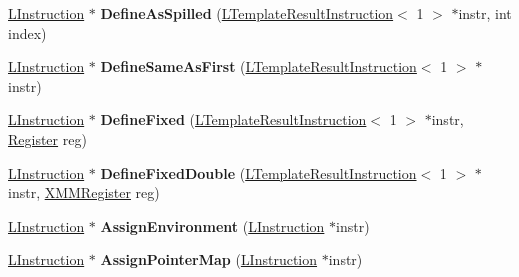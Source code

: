 \begin{DoxyCompactItemize}
\item 
\hyperlink{classv8_1_1internal_1_1_l_instruction}{L\+Instruction} $\ast$ {\bfseries Define\+As\+Spilled} (\hyperlink{classv8_1_1internal_1_1_l_template_result_instruction}{L\+Template\+Result\+Instruction}$<$ 1 $>$ $\ast$instr, int index)\hypertarget{classv8_1_1internal_1_1_l_chunk_builder_a4e42c6b4bb935cc879f078e349ee6a1d}{}\label{classv8_1_1internal_1_1_l_chunk_builder_a4e42c6b4bb935cc879f078e349ee6a1d}

\item 
\hyperlink{classv8_1_1internal_1_1_l_instruction}{L\+Instruction} $\ast$ {\bfseries Define\+Same\+As\+First} (\hyperlink{classv8_1_1internal_1_1_l_template_result_instruction}{L\+Template\+Result\+Instruction}$<$ 1 $>$ $\ast$instr)\hypertarget{classv8_1_1internal_1_1_l_chunk_builder_a7a3e6bb64466e8d0b7062311bc13455a}{}\label{classv8_1_1internal_1_1_l_chunk_builder_a7a3e6bb64466e8d0b7062311bc13455a}

\item 
\hyperlink{classv8_1_1internal_1_1_l_instruction}{L\+Instruction} $\ast$ {\bfseries Define\+Fixed} (\hyperlink{classv8_1_1internal_1_1_l_template_result_instruction}{L\+Template\+Result\+Instruction}$<$ 1 $>$ $\ast$instr, \hyperlink{structv8_1_1internal_1_1_register}{Register} reg)\hypertarget{classv8_1_1internal_1_1_l_chunk_builder_a7dfb72b4e8c8ed4fc4acb6c8ce207af9}{}\label{classv8_1_1internal_1_1_l_chunk_builder_a7dfb72b4e8c8ed4fc4acb6c8ce207af9}

\item 
\hyperlink{classv8_1_1internal_1_1_l_instruction}{L\+Instruction} $\ast$ {\bfseries Define\+Fixed\+Double} (\hyperlink{classv8_1_1internal_1_1_l_template_result_instruction}{L\+Template\+Result\+Instruction}$<$ 1 $>$ $\ast$instr, \hyperlink{structv8_1_1internal_1_1_double_register}{X\+M\+M\+Register} reg)\hypertarget{classv8_1_1internal_1_1_l_chunk_builder_a5b4a95fe2bd2cfba74c58d6c2a760d8c}{}\label{classv8_1_1internal_1_1_l_chunk_builder_a5b4a95fe2bd2cfba74c58d6c2a760d8c}

\item 
\hyperlink{classv8_1_1internal_1_1_l_instruction}{L\+Instruction} $\ast$ {\bfseries Assign\+Environment} (\hyperlink{classv8_1_1internal_1_1_l_instruction}{L\+Instruction} $\ast$instr)\hypertarget{classv8_1_1internal_1_1_l_chunk_builder_a57688ea94214122c105fd9dcb458067c}{}\label{classv8_1_1internal_1_1_l_chunk_builder_a57688ea94214122c105fd9dcb458067c}

\item 
\hyperlink{classv8_1_1internal_1_1_l_instruction}{L\+Instruction} $\ast$ {\bfseries Assign\+Pointer\+Map} (\hyperlink{classv8_1_1internal_1_1_l_instruction}{L\+Instruction} $\ast$instr)\hypertarget{classv8_1_1internal_1_1_l_chunk_builder_a310b14c9a7f420e8294d1180c8ea030b}{}\label{classv8_1_1internal_1_1_l_chunk_builder_a310b14c9a7f420e8294d1180c8ea030b}


\end{DoxyCompactItemize}
